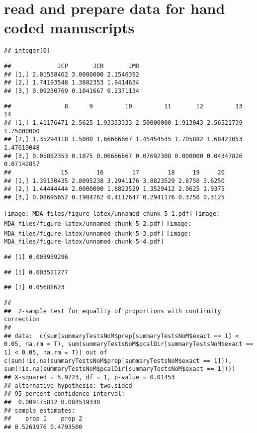\documentclass[
]{article}
\begin{document}
\section{read and prepare data for  hand coded manuscripts}

\begin{verbatim}
## integer(0)
\end{verbatim}

\begin{verbatim}
##             JCP       JCR       JMR
## [1,] 2.01538462 3.0000000 2.1546392
## [2,] 1.74193548 1.3882353 1.8414634
## [3,] 0.09230769 0.1041667 0.2371134
\end{verbatim}

\begin{verbatim}
##               8      9         10         11       12         13         14
## [1,] 1.41176471 2.5625 1.93333333 2.50000000 1.913043 2.56521739 1.75000000
## [2,] 1.35294118 1.5000 1.66666667 1.45454545 1.705882 1.68421053 1.47619048
## [3,] 0.05882353 0.1875 0.06666667 0.07692308 0.000000 0.04347826 0.07142857
##              15        16        17        18     19     20
## [1,] 1.39130435 2.8095238 3.2941176 3.8823529 2.8750 3.6250
## [2,] 1.44444444 2.0000000 1.8823529 1.3529412 2.0625 1.9375
## [3,] 0.08695652 0.1904762 0.4117647 0.2941176 0.3750 0.3125
\end{verbatim}

\texttt{[image: MDA\_files/figure-latex/unnamed-chunk-5-1.pdf]}
\texttt{[image: MDA\_files/figure-latex/unnamed-chunk-5-2.pdf]}
\texttt{[image: MDA\_files/figure-latex/unnamed-chunk-5-3.pdf]}
\texttt{[image: MDA\_files/figure-latex/unnamed-chunk-5-4.pdf]}

\begin{verbatim}
## [1] 0.003939296
\end{verbatim}

\begin{verbatim}
## [1] 0.003521277
\end{verbatim}

\begin{verbatim}
## [1] 0.05688623
\end{verbatim}

\begin{verbatim}
## 
##  2-sample test for equality of proportions with continuity correction
## 
## data:  c(sum(summaryTestsNoM$prep[summaryTestsNoM$exact == 1] < 0.05, na.rm = T), sum(summaryTestsNoM$pcalDir[summaryTestsNoM$exact == 1] < 0.05, na.rm = T)) out of c(sum(!is.na(summaryTestsNoM$prep[summaryTestsNoM$exact == 1])), sum(!is.na(summaryTestsNoM$pcalDir[summaryTestsNoM$exact == 1])))
## X-squared = 5.9723, df = 1, p-value = 0.01453
## alternative hypothesis: two.sided
## 95 percent confidence interval:
##  0.009175812 0.084519330
## sample estimates:
##    prop 1    prop 2 
## 0.5261976 0.4793500
\end{verbatim}
\end{document}
